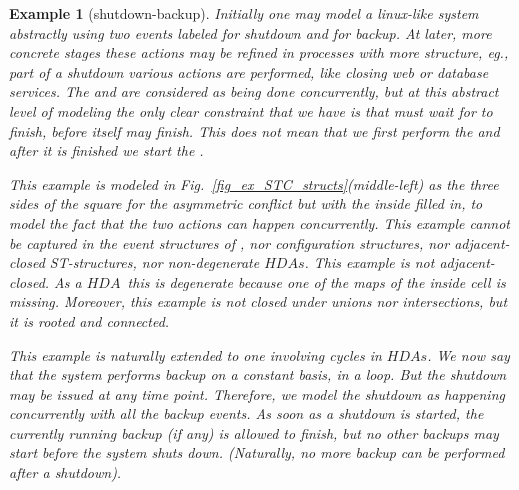 \documentclass[submission,copyright,creativecommons]{eptcs}
\newtheorem{example}[theorem]{Example}
\newcommand{\cp}[1]{}
\newcommand\HDA{\ensuremath{\mathit{HDA}}}
\newcommand\HDAs{\ensuremath{\mathit{HDAs}}}
\begin{document}
\cp{
The \HDA\ from Figure~\ref{fig_ex_STC_structs}(v) can be expressed with STC-structure but under the multiple-cancellation steps since the  temporarily cancels all the  events except the current  until both  and   (which can run in parallel) are finished; after this all the  events are enabled again to run as a Kleene-star.
}

\begin{example}[shutdown-backup]\label{ex_shutdown}
Initially one may model a linux-like system abstractly using two events labeled  for \textit{shutdown} and  for \textit{backup}. At later, more concrete stages these actions may be refined in processes with more structure, eg., part of a shutdown various actions are performed, like closing web or database services. 
The  and  are considered as being done concurrently, but at this abstract level of modeling the only clear constraint that we have is that  must wait for  to finish, before itself may finish. 
This does not mean that we first perform the  and after it is finished we start the . 

This example is modeled in Fig.~\ref{fig_ex_STC_structs}(middle-left) as the three sides of the square for the asymmetric conflict but with the inside filled in, to model the fact that the two actions can happen concurrently. 
This example cannot be captured in the event structures of \cite{GlabbeekP09configStruct}, nor configuration structures, nor adjacent-closed ST-structures, nor non-degenerate \HDAs.
This example is not adjacent-closed. As a \HDA\ this is \textit{degenerate} because one of the  maps of the inside cell is missing. Moreover, this example is not closed under unions nor intersections, but it is rooted and connected.



This example is naturally extended to one involving cycles in \HDAs.
We now say that the system performs \textit{backup on a constant basis}, in a loop. But the shutdown may be issued at any time point. Therefore, we model the shutdown as happening concurrently with all the backup events. As soon as a shutdown is started, the currently running backup (if any) is allowed to finish, but no other backups may start before the system shuts down. (Naturally, no more backup can be performed after a shutdown).


\end{example}
\end{document}
